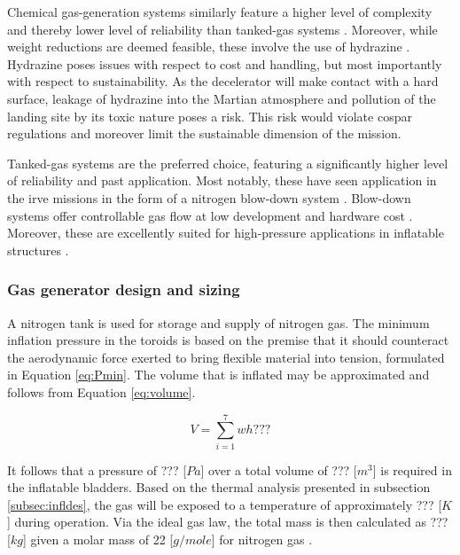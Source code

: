 Chemical gas-generation systems similarly feature a higher level of complexity and thereby lower level of reliability than tanked-gas systems \cite{Jenkins2001}. Moreover, while weight reductions are deemed feasible, these involve the use of hydrazine \cite{Jenkins2001, Freeland1998}. Hydrazine poses issues with respect to cost and handling, but most importantly with respect to sustainability. As the decelerator will make contact with a hard surface, leakage of hydrazine into the Martian atmosphere and pollution of the landing site by its toxic nature poses a risk. This risk would violate \gls{cospar} regulations and moreover limit the sustainable dimension of the mission.

Tanked-gas systems are the preferred choice, featuring a significantly higher level of reliability and past application. Most notably, these have seen application in the \gls{irve} missions in the form of a nitrogen blow-down system \cite{Smith2010}. Blow-down systems offer controllable gas flow at low development and hardware cost \cite{Freeland1998}. Moreover, these are excellently suited for high-pressure applications in inflatable structures \cite{Jenkins2001}.



\subsubsection{Gas generator design and sizing}
A nitrogen tank is used for storage and supply of nitrogen gas. The minimum inflation pressure in the toroids is based on the premise that it should counteract the aerodynamic force exerted to bring flexible material into tension, formulated in Equation \ref{eq:Pmin}. The volume that is inflated may be approximated and follows from Equation \ref{eq:volume}.

\begin{equation}
V = \sum_{i=1}^{7} wh ???
\label{eq:volume}
\end{equation}

It follows that a pressure of  ??? [$Pa$] over a total volume of ??? [$m^{3}$] is required in the inflatable bladders. Based on the thermal analysis presented in subsection \ref{subsec:infldes}, the gas will be exposed to a temperature of approximately ??? [$K$] during operation. Via the ideal gas law, the total mass is then calculated as ??? [$kg$] given a molar mass of 22 [$g/mole$] for nitrogen gas \cite{Samareh2011}.

